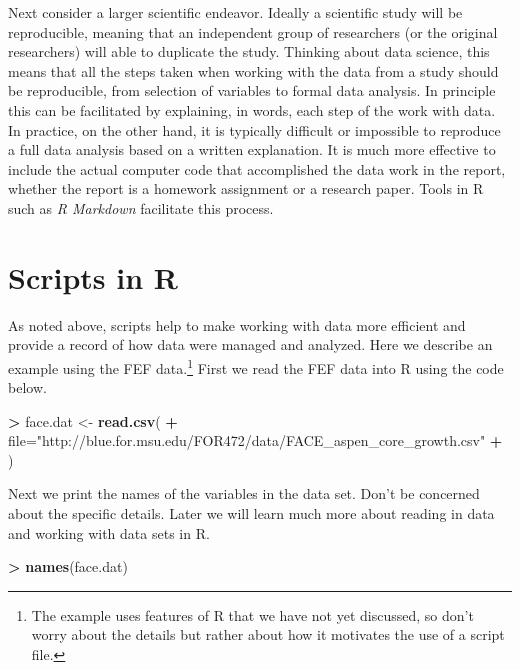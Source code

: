 \documentclass[]{krantz}
\makeatletter
\newenvironment{Shaded}{\begin{snugshade}}{\end{snugshade}}
\newcommand{\KeywordTok}[1]{\textcolor[rgb]{0.27,0.27,0.27}{\textbf{#1}}}
\newcommand{\DataTypeTok}[1]{\textcolor[rgb]{0.27,0.27,0.27}{#1}}
\newcommand{\StringTok}[1]{\textcolor[rgb]{0.5,0.5,0.5}{#1}}
\newcommand{\OperatorTok}[1]{\textcolor[rgb]{0.43,0.43,0.43}{\textbf{#1}}}
\newcommand{\NormalTok}[1]{#1}
\newenvironment{kframe}{%
\medskip{}
\setlength{\fboxsep}{.8em}
 \def\at@end@of@kframe{}%
 \ifinner\ifhmode%
  \def\at@end@of@kframe{\end{minipage}}%
  \begin{minipage}{\columnwidth}%
 \fi\fi%
 \def\FrameCommand##1{\hskip\@totalleftmargin \hskip-\fboxsep
 \colorbox{shadecolor}{##1}\hskip-\fboxsep
     \hskip-\linewidth \hskip-\@totalleftmargin \hskip\columnwidth}%
 \MakeFramed {\advance\hsize-\width
   \@totalleftmargin\z@ \linewidth\hsize
   \@setminipage}}%
 {\par\unskip\endMakeFramed%
 \at@end@of@kframe}
\renewenvironment{Shaded}{\begin{kframe}}{\end{kframe}}
\theoremstyle{definition}
\theoremstyle{definition}
\theoremstyle{definition}
\theoremstyle{remark}
\makeatother
\begin{document}
Next consider a larger scientific endeavor. Ideally a scientific study
will be reproducible, meaning that an independent group of researchers
(or the original researchers) will able to duplicate the study. Thinking
about data science, this means that all the steps taken when working
with the data from a study should be reproducible, from selection of
variables to formal data analysis. In principle this can be facilitated
by explaining, in words, each step of the work with data. In practice,
on the other hand, it is typically difficult or impossible to reproduce
a full data analysis based on a written explanation. It is much more
effective to include the actual computer code that accomplished the data
work in the report, whether the report is a homework assignment or a
research paper. Tools in R such as \emph{R Markdown} facilitate this
process.

\section{Scripts in R}\label{scripts-in-r}

As noted above, scripts help to make working with data more efficient
and provide a record of how data were managed and analyzed. Here we
describe an example using the FEF data.\footnote{The example uses
  features of R that we have not yet discussed, so don't worry about the
  details but rather about how it motivates the use of a script file.}
First we read the FEF data into R using the code below.

\begin{Shaded}
\begin{Highlighting}[]
\OperatorTok{>}\StringTok{ }\NormalTok{face.dat <-}\StringTok{ }\KeywordTok{read.csv}\NormalTok{(}
\OperatorTok{+}\StringTok{     }\DataTypeTok{file=}\StringTok{"http://blue.for.msu.edu/FOR472/data/FACE_aspen_core_growth.csv"}
\OperatorTok{+}\StringTok{ }\NormalTok{)}
\end{Highlighting}
\end{Shaded}

Next we print the names of the variables in the data set. Don't be
concerned about the specific details. Later we will learn much more
about reading in data and working with data sets in R.

\begin{Shaded}
\begin{Highlighting}[]
\OperatorTok{>}\StringTok{ }\KeywordTok{names}\NormalTok{(face.dat)}
\end{Highlighting}
\end{Shaded}
\end{document}
